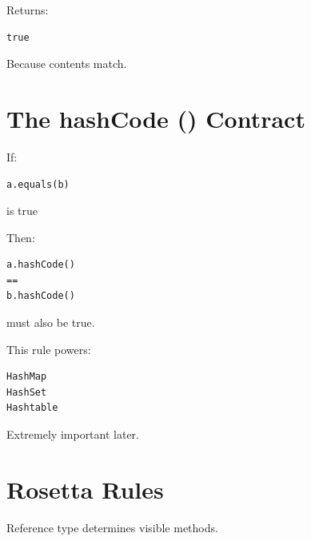 \documentclass[11pt,a4paper]{book}
\begin{document}

Returns:

\begin{verbatim}
true
\end{verbatim}


Because contents match.


\section{The hashCode () Contract}

If:

\begin{verbatim}
a.equals(b)
\end{verbatim}

is true


Then:

\begin{verbatim}
a.hashCode()
==
b.hashCode()
\end{verbatim}

must also be true.


This rule powers:

\begin{verbatim}
HashMap
HashSet
Hashtable
\end{verbatim}


Extremely important later.


\section{Rosetta Rules}

\begin{rosettarule}

Reference type determines
visible methods.

\end{rosettarule}

\end{document}
